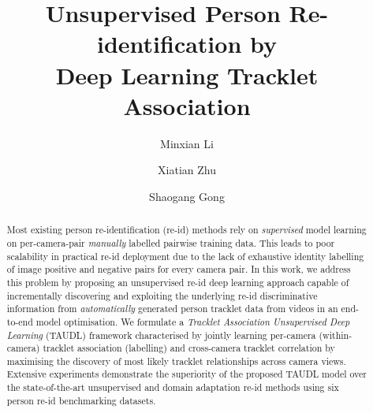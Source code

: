 \documentclass[runningheads]{llncs}
\begin{document}
\title{Unsupervised Person Re-identification by \\ Deep Learning Tracklet Association} 


\author{Minxian Li
	\and
	Xiatian Zhu
	\and
	Shaogang Gong
}


\maketitle              \begin{abstract}
Most existing person re-identification (re-id) methods rely on 
{\em supervised} model learning on per-camera-pair {\em manually} labelled pairwise training data.
This leads to poor scalability in practical re-id deployment
due to the lack of exhaustive identity labelling of image positive and negative pairs
for every camera pair. 
In this work, we address this problem 
by proposing an unsupervised re-id deep learning approach
capable of incrementally discovering and exploiting the underlying re-id discriminative
information from {\em automatically} generated person tracklet data from videos
in an end-to-end 
model optimisation.
We formulate a 
{\em Tracklet Association Unsupervised Deep Learning} 
(TAUDL) framework characterised by 
jointly learning per-camera (within-camera) tracklet association
(labelling) and cross-camera
tracklet correlation by maximising the discovery of most likely tracklet relationships 
across camera views.
Extensive experiments 
demonstrate the superiority of the proposed TAUDL model
over the state-of-the-art unsupervised and domain adaptation re-id
methods using six person re-id benchmarking datasets.
\end{abstract}
\end{document}
